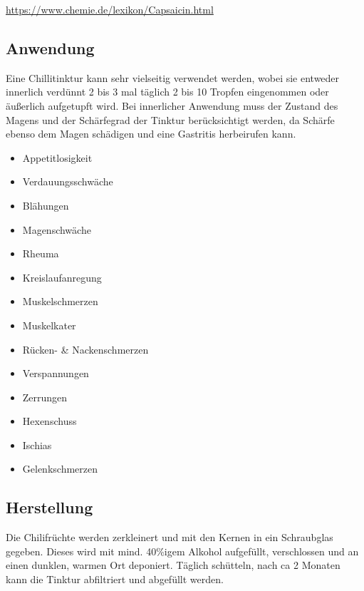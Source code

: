 \url{https://www.chemie.de/lexikon/Capsaicin.html}

               

\subsection{Anwendung}

Eine Chillitinktur kann sehr vielseitig verwendet werden, wobei sie entweder innerlich verdünnt 2 bis 3  mal täglich 2 bis 10 Tropfen eingenommen oder äußerlich aufgetupft wird. Bei innerlicher Anwendung muss der Zustand des Magens und der Schärfegrad der Tinktur berücksichtigt werden, da Schärfe ebenso dem Magen schädigen und eine Gastritis herbeirufen kann. 

\begin{itemize}
	\item Appetitlosigkeit
	\item Verdauungsschwäche
	\item Blähungen
	\item Magenschwäche
	\item Rheuma
	\item Kreislaufanregung
	\item Muskelschmerzen
	\item Muskelkater
	\item Rücken- \& Nackenschmerzen
	\item Verspannungen
	\item Zerrungen
	\item Hexenschuss
	\item Ischias
	\item Gelenkschmerzen 
\end{itemize}

\subsection{Herstellung}

Die Chilifrüchte werden zerkleinert und mit den Kernen in ein Schraubglas gegeben. Dieses wird mit mind. 40\%igem Alkohol aufgefüllt, verschlossen und an einen dunklen, warmen Ort deponiert. Täglich schütteln, nach ca 2 Monaten kann die Tinktur abfiltriert und abgefüllt werden.


